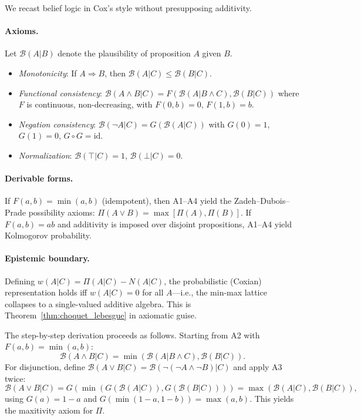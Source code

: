 \documentclass[12pt]{article}
\begin{document}
We recast belief logic in Cox's style \cite{cox1946} without presupposing
additivity.

\paragraph{Axioms.}
Let $\mathcal{B}(A|B)$ denote the plausibility of proposition $A$ given $B$.
\begin{itemize}
\item[A1.] \textit{Monotonicity}: If $A\Rightarrow B$, then $\mathcal{B}(A|C)\le\mathcal{B}(B|C)$.
\item[A2.] \textit{Functional consistency}:
  $\mathcal{B}(A\wedge B|C)=F(\mathcal{B}(A|B\wedge C),\mathcal{B}(B|C))$
  where $F$ is continuous, non-decreasing, with $F(0,b)=0$, $F(1,b)=b$.
\item[A3.] \textit{Negation consistency}:
  $\mathcal{B}(\neg A|C)=G(\mathcal{B}(A|C))$ with $G(0)=1$, $G(1)=0$, $G\circ G=\mathrm{id}$.
\item[A4.] \textit{Normalization}: $\mathcal{B}(\top|C)=1$, $\mathcal{B}(\bot|C)=0$.
\end{itemize}

\paragraph{Derivable forms.}
If $F(a,b)=\min(a,b)$ (idempotent), then A1--A4 yield the Zadeh--Dubois--Prade
possibility axioms: $\Pi(A\vee B)=\max[\Pi(A),\Pi(B)]$.
If $F(a,b)=ab$ and additivity is imposed over disjoint propositions,
A1--A4 yield Kolmogorov probability.

\paragraph{Epistemic boundary.}
Defining $w(A|C)=\Pi(A|C)-N(A|C)$, the probabilistic (Coxian) representation
holds iff $w(A|C)=0$ for all $A$---i.e., the min-max lattice collapses to a
single-valued additive algebra.
This is Theorem~\ref{thm:choquet_lebesgue} in axiomatic guise.

The step-by-step derivation proceeds as follows.
Starting from A2 with $F(a,b)=\min(a,b)$:
\[
\mathcal{B}(A\wedge B|C) = \min(\mathcal{B}(A|B\wedge C),\mathcal{B}(B|C)).
\]
For disjunction, define $\mathcal{B}(A\vee B|C)=\mathcal{B}(\neg(\neg A\wedge\neg B)|C)$
and apply A3 twice:
\[
\mathcal{B}(A\vee B|C) = G(\min(G(\mathcal{B}(A|C)),G(\mathcal{B}(B|C))))
= \max(\mathcal{B}(A|C),\mathcal{B}(B|C)),
\]
using $G(a)=1-a$ and $G(\min(1-a,1-b))=\max(a,b)$.
This yields the maxitivity axiom for $\Pi$.
\end{document}
